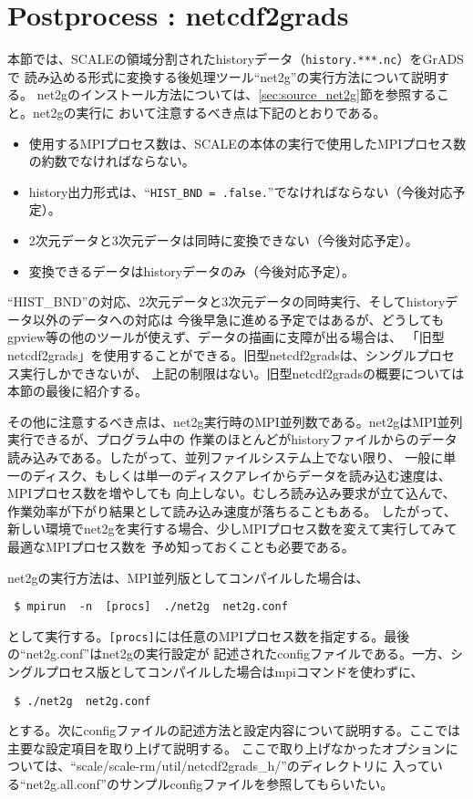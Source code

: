 \section{Postprocess : netcdf2grads}
\label{sec:net2g}

本節では、SCALEの領域分割されたhistoryデータ（\verb|history.***.nc|）をGrADSで
読み込める形式に変換する後処理ツール``net2g''の実行方法について説明する。
net2gのインストール方法については、\ref{sec:source_net2g}節を参照すること。net2gの実行に
おいて注意するべき点は下記のとおりである。

\begin{itemize}
 \item 使用するMPIプロセス数は、SCALEの本体の実行で使用したMPIプロセス数の約数でなければならない。
 \item history出力形式は、``\verb|HIST_BND = .false.|''でなければならない（今後対応予定）。
 \item 2次元データと3次元データは同時に変換できない（今後対応予定）。
 \item 変換できるデータはhistoryデータのみ（今後対応予定）。
\end{itemize}

``HIST\_BND''の対応、2次元データと3次元データの同時実行、そしてhistoryデータ以外のデータへの対応は
今後早急に進める予定ではあるが、どうしてもgpview等の他のツールが使えず、データの描画に支障が出る場合は、
「旧型netcdf2grads」を使用することができる。旧型netcdf2gradsは、シングルプロセス実行しかできないが、
上記の制限はない。旧型netcdf2gradsの概要については本節の最後に紹介する。

その他に注意するべき点は、net2g実行時のMPI並列数である。net2gはMPI並列実行できるが、プログラム中の
作業のほとんどがhistoryファイルからのデータ読み込みである。したがって、並列ファイルシステム上でない限り、
一般に単一のディスク、もしくは単一のディスクアレイからデータを読み込む速度は、MPIプロセス数を増やしても
向上しない。むしろ読み込み要求が立て込んで、作業効率が下がり結果として読み込み速度が落ちることもある。
したがって、新しい環境でnet2gを実行する場合、少しMPIプロセス数を変えて実行してみて最適なMPIプロセス数を
予め知っておくことも必要である。

net2gの実行方法は、MPI並列版としてコンパイルした場合は、
\begin{verbatim}
 $ mpirun  -n  [procs]  ./net2g  net2g.conf
\end{verbatim}
として実行する。\verb|[procs]|には任意のMPIプロセス数を指定する。最後の``net2g.conf''はnet2gの実行設定が
記述されたconfigファイルである。一方、シングルプロセス版としてコンパイルした場合はmpiコマンドを使わずに、
\begin{verbatim}
 $ ./net2g  net2g.conf
\end{verbatim}
とする。次にconfigファイルの記述方法と設定内容について説明する。ここでは主要な設定項目を取り上げて説明する。
ここで取り上げなかったオプションについては、``scale/scale-rm/util/netcdf2grads\_h/''のディレクトリに
入っている``net2g.all.conf''のサンプルconfigファイルを参照してもらいたい。

